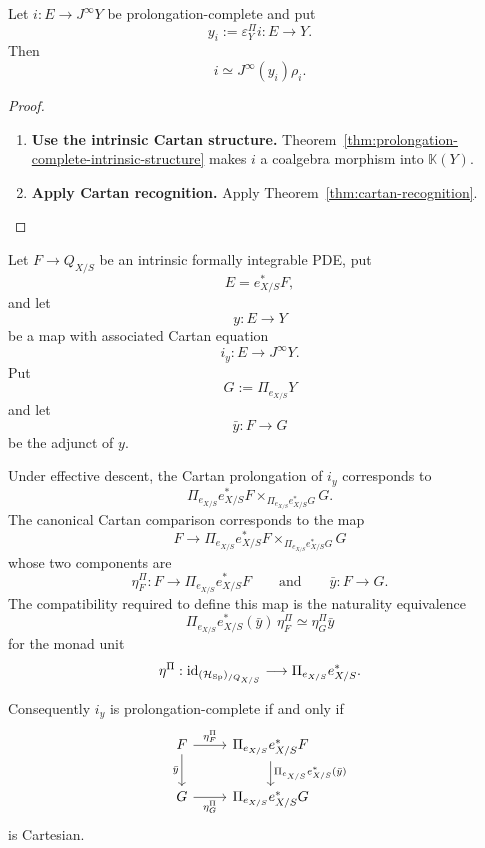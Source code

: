 \begin{corollary}
Let \(i:E\to J^\infty Y\) be prolongation-complete and put
\[
  y_i:=\varepsilon^\Pi_Yi:E\to Y.
\]
Then
\[
  i\simeq J^\infty(y_i)\rho_i.
\]
\end{corollary}

\begin{proof}
\leavevmode
\begin{enumerate}[label=\textup{(\arabic*)}]
    \item \textbf{Use the intrinsic Cartan structure.}
Theorem~\ref{thm:prolongation-complete-intrinsic-structure} makes \(i\) a coalgebra
morphism into \(\mathbb K(Y)\).

    \item \textbf{Apply Cartan recognition.}
Apply
Theorem~\ref{thm:cartan-recognition}.
\end{enumerate}
\end{proof}

\begin{theorem}
\label{thm:quotient-prolongation-criterion}
Let \(F\to Q_{X/S}\) be an intrinsic formally integrable PDE, put
\[
  E=e_{X/S}^*F,
\]
and let
\[
  y:E\to Y
\]
be a map with associated Cartan equation
\[
  i_y:E\to J^\infty Y.
\]
Put
\[
  G:=\Pi_{e_{X/S}}Y
\]
and let
\[
  \bar y:F\to G
\]
be the adjunct of \(y\).

Under effective descent, the Cartan prolongation of \(i_y\) corresponds to
\[
  \Pi_{e_{X/S}}e_{X/S}^*F
  \times_{\Pi_{e_{X/S}}e_{X/S}^*G}
  G.
\]
The canonical Cartan comparison corresponds to the map
\[
  F\longrightarrow
  \Pi_{e_{X/S}}e_{X/S}^*F
  \times_{\Pi_{e_{X/S}}e_{X/S}^*G}
  G
\]
whose two components are
\[
  \eta^\Pi_F:F\to\Pi_{e_{X/S}}e_{X/S}^*F
  \qquad\text{and}\qquad
  \bar y:F\to G.
\]
The compatibility required to define this map is the naturality equivalence
\[
  \Pi_{e_{X/S}}e_{X/S}^*(\bar y)\,\eta^\Pi_F
  \simeq
  \eta^\Pi_G\bar y
\]
for the monad unit
\[
  \eta^\Pi:\operatorname{id}_{(\mathcal H_{\operatorname{Sp}})_{/Q_{X/S}}}
  \longrightarrow
  \Pi_{e_{X/S}}e_{X/S}^*.
\]

Consequently \(i_y\) is prolongation-complete if and only if
\[
\begin{tikzcd}
F \ar[r,"\eta^\Pi_F"] \ar[d,"\bar y"']
  & \Pi_{e_{X/S}}e_{X/S}^*F
      \ar[d,"\Pi_{e_{X/S}}e_{X/S}^*(\bar y)"]\\
G \ar[r,"\eta^\Pi_G"']
  & \Pi_{e_{X/S}}e_{X/S}^*G
\end{tikzcd}
\]
is Cartesian.
\end{theorem}


